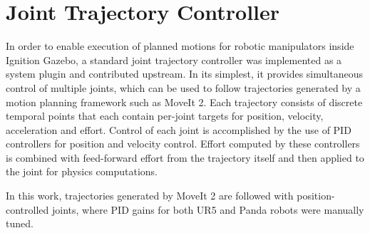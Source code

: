 \section{Joint Trajectory Controller}\label{app:joint_trajectory_controller}

In order to enable execution of planned motions for robotic manipulators inside Ignition Gazebo, a standard joint trajectory controller was implemented as a system plugin and contributed upstream. In its simplest, it provides simultaneous control of multiple joints, which can be used to follow trajectories generated by a motion planning framework such as MoveIt 2. Each trajectory consists of discrete temporal points that each contain per-joint targets for position, velocity, acceleration and effort. Control of each joint is accomplished by the use of PID controllers for position and velocity control. Effort computed by these controllers is combined with feed-forward effort from the trajectory itself and then applied to the joint for physics computations.

In this work, trajectories generated by MoveIt 2 are followed with position-controlled joints, where PID gains for both UR5 and Panda robots were manually tuned.
